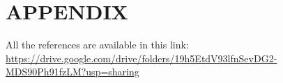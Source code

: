 \documentclass[conference]{IEEEtran}
\begin{document}
\addtolength{\textheight}{-12cm}   %







\section*{APPENDIX}

All the references are available in this link: \url{https://drive.google.com/drive/folders/19h5EtdV93lfnSevDG2-MDS90Ph91fzLM?usp=sharing} 


\printbibliography
\end{document}
